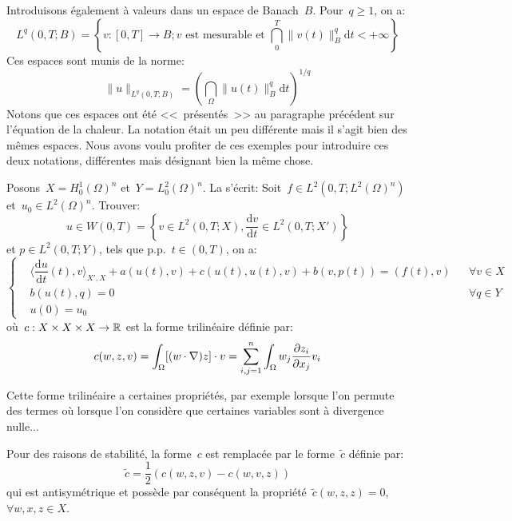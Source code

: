 \medskip
Introduisons également  à valeurs dans un espace
de Banach~$B$. Pour~$q\ge1$, on a:
\begin{equation}
L^q(0,T;B) =\left\{ v: [0,T]\rightarrow B; v \text{ est mesurable et }
\dint_0^T \|v(t)\|^q_B \mathrm dt<+\infty\right\}
\end{equation}
Ces espaces sont munis de la norme:
\begin{equation}
\|u\|_{L^q(0,T;B)} = \left(\dint_\Omega\|u(t)\|^q_B \mathrm dt\right)^{1/q}
\end{equation}
Notons que ces espaces ont été <<~présentés~>> au paragraphe précédent
sur l'équation de la chaleur. La notation était un peu différente mais il s'agit bien
des mêmes espaces. Nous avons voulu profiter de ces exemples pour introduire
ces deux notations, différentes mais désignant bien la même chose.

\medskip
Posons~$X=H^1_0(\Omega)^n$ et~$Y=L^2_0(\Omega)^n$.
\medskip
La  s'écrit: Soit~$f\in L^2(0,T;L^2(\Omega)^n)$ et~$u_0\in L^2(\Omega)^n$.
Trouver:
\begin{equation}u\in W(0,T)=\left\{v\in L^2(0,T;X), \dfrac{\mathrm dv}{\mathrm dt}\in L^2(0,T;X') \right\}\end{equation} et
$p\in L^2(0,T;Y)$, tels que p.p.~$t\in(0,T)$, on a:
\begin{equation}\left\{
\begin{aligned}
&\langle\dfrac{\mathrm du}{\mathrm dt}(t),v\rangle_{X',X}+a(u(t),v)+c(u(t),u(t),v)+b(v,p(t)) = (f(t),v) &&
\forall v\in X\\
&b(u(t),q) =0 &&\forall q \in Y\\
&u(0)=u_0
\end{aligned}\right.
\end{equation}
où~$c: X\times X\times X\rightarrow\mathbb R$ est la forme trilinéaire définie par:
\begin{equation}
c(w,z,v) = \dint_\Omega [(w\cdot\nabla)z]\cdot v %
=\dsum_{i,j=1}^n \dint_\Omega w_j\dfrac{\partial z_i}{\partial x_j} v_i %
\end{equation}

\medskip
Cette forme trilinéaire a certaines propriétés, par exemple lorsque l'on permute
des termes où lorsque l'on considère que certaines variables sont à divergence nulle...

\medskip
Pour des raisons de stabilité, la forme~$c$ est remplacée par le forme~$\tilde{c}$ définie par:
\begin{equation}
\tilde{c} = \dfrac12 \left(c(w,z,v)-c(w,v,z)\right)
\end{equation}
qui est antisymétrique et possède par conséquent la propriété~$\tilde{c}(w,z,z)=0$,
$\forall w,x,z \in X$.

